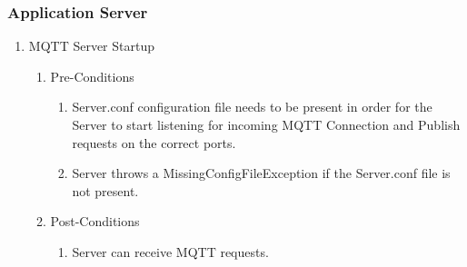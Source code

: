 \documentclass{article}
\begin{document}
\subsubsection{Application Server}
\begin{enumerate}
	\item	MQTT Server Startup
	\begin{enumerate}
		\item  Pre-Conditions
		\begin{enumerate}
			\item  	Server.conf configuration file needs to be present in order for the Server to start listening for incoming MQTT Connection and 
			Publish requests on the correct ports.
			\item	Server throws a MissingConfigFileException if the Server.conf file is not present.
		\end{enumerate}
		\item  Post-Conditions		
		\begin{enumerate}
			\item	Server can receive MQTT requests.
		\end{enumerate}
	\end{enumerate}
		\end{enumerate}
\end{document}

